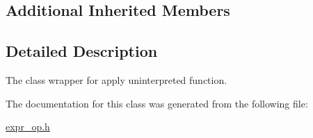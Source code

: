 \subsection*{Additional Inherited Members}


\subsection{Detailed Description}
The class wrapper for apply uninterpreted function. 

The documentation for this class was generated from the following file\+:\begin{DoxyCompactItemize}
\item 
\mbox{\hyperlink{expr__op_8h}{expr\+\_\+op.\+h}}\end{DoxyCompactItemize}
